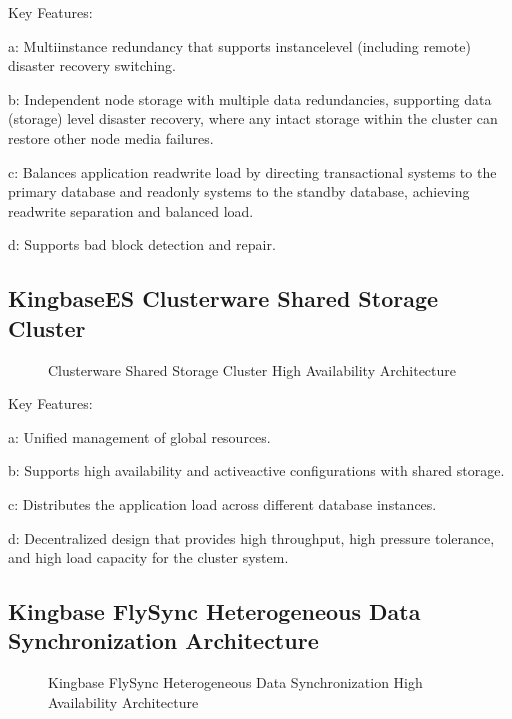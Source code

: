 \documentclass[letterpaper,10pt,english]{sphinxmanual}
\begin{document}
\sphinxAtStartPar
Key Features:

\sphinxAtStartPar
a: Multi\sphinxhyphen{}instance redundancy that supports instance\sphinxhyphen{}level (including remote) disaster recovery switching.

\sphinxAtStartPar
b: Independent node storage with multiple data redundancies, supporting data (storage) level disaster recovery, where any intact storage within the cluster can restore other node media failures.

\sphinxAtStartPar
c: Balances application read\sphinxhyphen{}write load by directing transactional systems to the primary database and read\sphinxhyphen{}only systems to the standby database, achieving read\sphinxhyphen{}write separation and balanced load.

\sphinxAtStartPar
d: Supports bad block detection and repair.


\subsection{KingbaseES Clusterware Shared Storage Cluster}
\label{\detokenize{highly-availability-3-en:kingbasees-clusterware-shared-storage-cluster}}
\begin{figure}[htbp]
\centering
\capstart

\noindent{}
\caption{Clusterware Shared Storage Cluster High Availability Architecture}\label{\detokenize{highly-availability-3-en:id2}}\end{figure}

\sphinxAtStartPar
Key Features:

\sphinxAtStartPar
a: Unified management of global resources.

\sphinxAtStartPar
b: Supports high availability and active\sphinxhyphen{}active configurations with shared storage.

\sphinxAtStartPar
c: Distributes the application load across different database instances.

\sphinxAtStartPar
d: Decentralized design that provides high throughput, high pressure tolerance, and high load capacity for the cluster system.


\subsection{Kingbase FlySync Heterogeneous Data Synchronization Architecture}
\label{\detokenize{highly-availability-3-en:kingbase-flysync-heterogeneous-data-synchronization-architecture}}
\begin{figure}[htbp]
\centering
\capstart

\noindent{}
\caption{Kingbase FlySync Heterogeneous Data Synchronization High Availability Architecture}\label{\detokenize{highly-availability-3-en:id3}}\end{figure}
\end{document}
